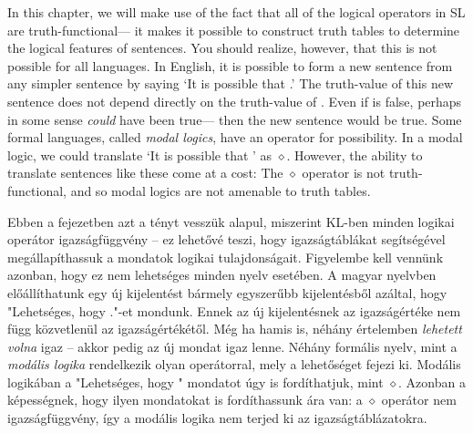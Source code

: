 In this chapter, we will make use of the fact that all of the logical operators in SL are truth-functional--- it makes it possible to construct truth tables to determine the logical features of sentences. You should realize, however, that this is not possible for all languages. In English, it is possible to form a new sentence from any simpler sentence  by saying `It is possible that .' The truth-value of this new sentence does not depend directly on the truth-value of . Even if  is false, perhaps in some sense  \emph{could} have been true--- then the new sentence would be true. Some formal languages, called \emph{modal logics}, have an operator for {possibility}. In a modal logic, we could translate `It is possible that ' as {\large $\diamond$}. However, the ability to translate sentences like these come at a cost: The {\large $\diamond$} operator is not truth-functional, and so modal logics are not amenable to truth tables.

Ebben a fejezetben azt a tényt vesszük alapul, miszerint KL-ben minden logikai operátor igazságfüggvény – ez lehetővé teszi, hogy igazságtáblákat segítségével megállapíthassuk a mondatok logikai tulajdonságait. Figyelembe kell vennünk azonban, hogy ez nem lehetséges minden nyelv esetében. A magyar nyelvben előállíthatunk egy új kijelentést bármely egyszerűbb  kijelentésből azáltal, hogy "Lehetséges, hogy ."-et mondunk. Ennek az új kijelentésnek az igazságértéke nem függ közvetlenül az  igazságértékétől. Még ha  hamis is, néhány értelemben  \emph{lehetett volna} igaz – akkor pedig az új mondat igaz lenne. Néhány formális nyelv, mint a \emph{modális logika} rendelkezik olyan operátorral, mely a lehetőséget fejezi ki. Modális logikában a "Lehetséges, hogy " mondatot úgy is fordíthatjuk, mint {\large $\diamond$}. Azonban a képességnek, hogy ilyen mondatokat is fordíthassunk ára van: a {\large $\diamond$} operátor nem igazságfüggvény, így a modális logika nem terjed ki az igazságtáblázatokra.



